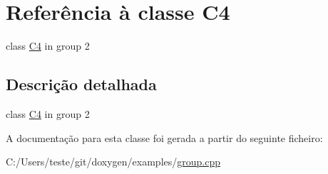 \hypertarget{class_c4}{\section{Referência à classe C4}
\label{class_c4}
}


class \hyperlink{class_c4}{C4} in group 2  




\subsection{Descrição detalhada}
class \hyperlink{class_c4}{C4} in group 2 

A documentação para esta classe foi gerada a partir do seguinte ficheiro\-:\begin{DoxyCompactItemize}
\item 
C\-:/\-Users/teste/git/doxygen/examples/\hyperlink{group_8cpp}{group.\-cpp}\end{DoxyCompactItemize}
